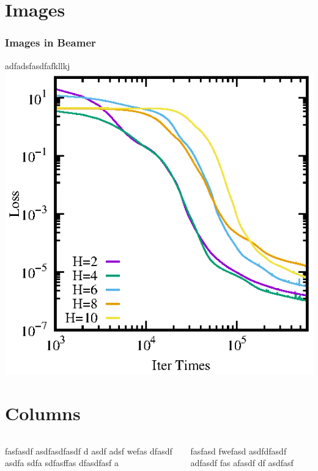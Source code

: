 \documentclass{beamer}
\begin{document}
\section{Images}
\begin{frame}
	\frametitle{Images in Beamer}
	adfadsfasdfafkllkj
	\includegraphics[height=.75\textheight]{./loss_changes_less.eps}
\end{frame}


\section{Columns}
\begin{frame}
\begin{columns}


fasfasdf asdfasdfasdf d asdf adsf wefas dfasdf asdfa sdfa sdfasffas dfasdfasf a

fasfasd fwefasd asdfdfasdf adfasdf  fas  afasdf df asdfasf
\end{columns}
\end{frame}
\end{document}
